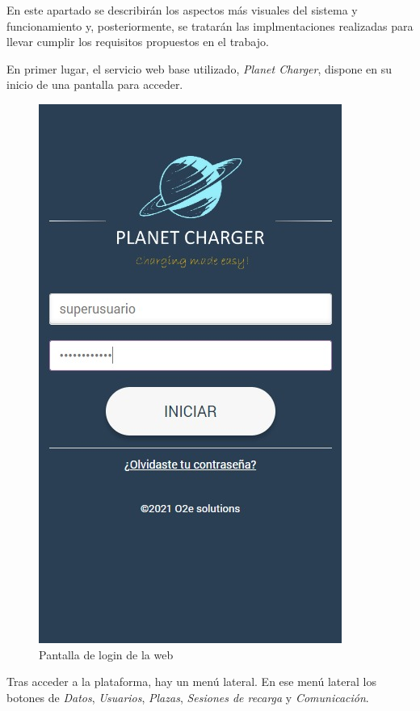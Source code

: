 \documentclass[12pt,a4paper,onecolumn,oneside]{report}
\begin{document}
En este apartado se describirán los aspectos más visuales del sistema y funcionamiento y, posteriormente, se tratarán las implmentaciones realizadas para llevar cumplir los requisitos propuestos en el trabajo.

En primer lugar, el servicio web base utilizado, \textit{Planet Charger}, dispone en su inicio de una pantalla para acceder.

\begin{figure}[H] 
\centering
  \includegraphics[width=.5\textwidth]{figuras/design1.png}
  \caption[Pantalla de login de la web]{Pantalla de login de la web\\
  }
  \label{fig:design1}
\end{figure}

Tras acceder a la plataforma, hay un menú lateral. En ese menú lateral los botones de \textit{Datos}, \textit{Usuarios}, \textit{Plazas}, \textit{Sesiones de recarga} y \textit{Comunicación}.
\end{document}
